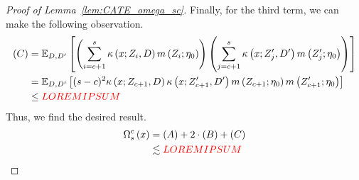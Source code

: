 \begin{proof}[Proof of Lemma~\ref{lem:CATE_omega_sc}]
    Finally, for the third term, we can make the following observation.
	\begin{equation}
		\begin{aligned}
			(C)
			& = \mathbb{E}_{D, D^{\prime}}\left[\left(\sum_{i = c + 1}^{s} \kappa\left(x; Z_{i}, D\right) m\left(Z_{i}; \eta_{0}\right)\right)
            \left(\sum_{j = c + 1}^{s} \kappa\left(x; Z_{j}^{\prime}, D^{\prime}\right) m\left(Z_{j}^{\prime}; \eta_{0}\right)\right)\right] \\
			& = \mathbb{E}_{D, D^{\prime}}\left[(s-c)^2 \kappa\left(x; Z_{c+1}, D\right)\kappa\left(x; Z_{c+1}^{\prime}, D^{\prime}\right)
			m\left(Z_{c+1}; \eta_{0}\right)  m\left(Z_{c+1}^{\prime}; \eta_{0}\right)\right] \\
			& \leq {\color{red} LOREM IPSUM}
		\end{aligned}
	\end{equation}
	Thus, we find the desired result.
	\begin{equation}
		\begin{aligned}
			\Omega_{s}^{c}\left(x\right)
			& = (A) + 2\cdot (B) + (C) \\
			& \lesssim {\color{red} LOREM IPSUM}
		\end{aligned}
	\end{equation}
\end{proof}

